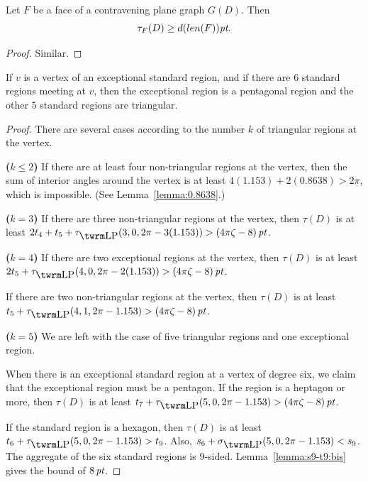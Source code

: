 \begin{proposition}
    \label{proposition:wttau}
    Let $F$ be a face of a contravening plane graph $G(D)$.
    Then
    $$\tau_F(D) \ge d(len(F))\hbox{\it pt}.$$
\end{proposition}

\begin{proof} Similar.
\end{proof}

\begin{lemma}  If $v$  is a vertex of an exceptional standard region,
and if there are $6$ standard regions meeting at $v$, then the
exceptional region is a pentagonal region and the other $5$
standard regions are triangular.
\end{lemma}


\begin{proof}
There are several cases according to the number $k$ of triangular
regions at the vertex.

{\bf($k\le2$)} If there are at least four non-triangular regions
at the vertex, then the sum of interior angles around the vertex
is at least $4(1.153)+2(0.8638)>2\pi$, which is impossible.  (See
Lemma~\ref{lemma:0.8638}.)

{\bf($k=3$)} If there are three non-triangular regions at the
vertex, then $\tau(D)$ is at least
$2t_4+t_5+\tauLP(3,0,2\pi-3(1.153))>\squander$.

{\bf($k=4$)} If there are two exceptional regions at the vertex,
then $\tau(D)$ is at least
$2t_5+\tauLP(4,0,2\pi-2(1.153))>\squander$.

If there are two non-triangular regions at the vertex, then
$\tau(D)$ is at least  $t_5+\tauLP(4,1,2\pi-1.153)>\squander$.

{\bf($k=5$)} We are left with the case of five triangular regions
and one exceptional region.

When there is an exceptional standard region at a vertex of degree
six, we claim that the exceptional region must be a pentagon. If
the region is a heptagon or more, then $\tau(D)$ is at least
$t_7+\tauLP(5,0,2\pi-1.153) > \squander$.

If the standard region is a hexagon, then $\tau(D)$ is at least
$t_6 + \tauLP(5,0,2\pi-1.153) > t_9$. Also,
$s_6+\sLP(5,0,2\pi-1.153) < s_9$. The aggregate of the six
standard regions is $9$-sided.  Lemma~\ref{lemma:s9-t9:bis} gives
the bound of $8\,\hbox{\it pt}$.
\end{proof}


